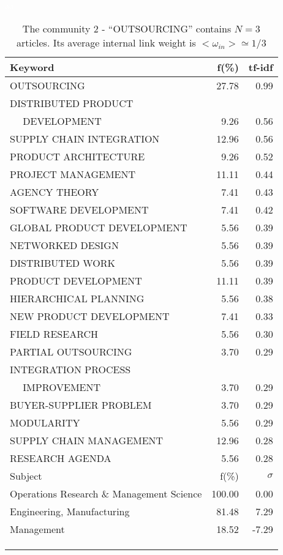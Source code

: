 \documentclass[a4paper,11pt]{report}
\begin{document}
\begin{landscape}
\clearpage

\begin{table}[!ht]
\caption{The community 2 - ``OUTSOURCING'' contains $N = 3$ articles. Its average internal link weight is $<\omega_{in}> \simeq 1/3$ }
\textcolor{white}{aa}\\
{\scriptsize\begin{tabular}{|l r  r|}
\hline
Keyword & f(\%) & tf-idf \\
\hline
OUTSOURCING & 27.78 & 0.99\\
DISTRIBUTED PRODUCT &  &\\
$\quad$ DEVELOPMENT & 9.26 & 0.56\\
SUPPLY CHAIN INTEGRATION & 12.96 & 0.56\\
PRODUCT ARCHITECTURE & 9.26 & 0.52\\
PROJECT MANAGEMENT & 11.11 & 0.44\\
AGENCY THEORY & 7.41 & 0.43\\
SOFTWARE DEVELOPMENT & 7.41 & 0.42\\
GLOBAL PRODUCT DEVELOPMENT & 5.56 & 0.39\\
NETWORKED DESIGN & 5.56 & 0.39\\
DISTRIBUTED WORK & 5.56 & 0.39\\
PRODUCT DEVELOPMENT & 11.11 & 0.39\\
HIERARCHICAL PLANNING & 5.56 & 0.38\\
NEW PRODUCT DEVELOPMENT & 7.41 & 0.33\\
FIELD RESEARCH & 5.56 & 0.30\\
PARTIAL OUTSOURCING & 3.70 & 0.29\\
INTEGRATION PROCESS &  &\\
$\quad$ IMPROVEMENT & 3.70 & 0.29\\
BUYER-SUPPLIER PROBLEM & 3.70 & 0.29\\
MODULARITY & 5.56 & 0.29\\
SUPPLY CHAIN MANAGEMENT & 12.96 & 0.28\\
RESEARCH AGENDA & 5.56 & 0.28\\
\hline
\hline
Subject & f(\%) & $\sigma$\\
\hline
Operations Research \& Management Science & 100.00 & 0.00\\
Engineering, Manufacturing & 81.48 & 7.29\\
Management & 18.52 & -7.29\\
 &  & \\
 &  & \\
 &  & \\

\end{tabular}}
\end{table}
\end{landscape}
\end{document}
